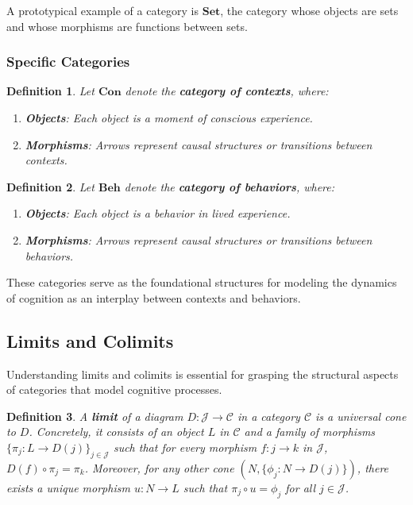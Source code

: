 \documentclass{article}
\newtheorem{definition}{Definition}[section]
\begin{document}
A prototypical example of a category is $\mathbf{Set}$, the category whose objects are sets and whose morphisms are functions between sets.

\subsubsection{Specific Categories}

\begin{definition}
Let $\mathbf{Con}$ denote the \textbf{category of contexts}, where:
\begin{enumerate}
    \item \textbf{Objects}: Each object is a moment of conscious experience.
    \item \textbf{Morphisms}: Arrows represent causal structures or transitions between contexts.
\end{enumerate}
\end{definition}

\begin{definition}
Let $\mathbf{Beh}$ denote the \textbf{category of behaviors}, where:
\begin{enumerate}
    \item \textbf{Objects}: Each object is a behavior in lived experience.
    \item \textbf{Morphisms}: Arrows represent causal structures or transitions between behaviors.
\end{enumerate}
\end{definition}

These categories serve as the foundational structures for modeling the dynamics of cognition as an interplay between contexts and behaviors.

\subsection{Limits and Colimits}

Understanding limits and colimits is essential for grasping the structural aspects of categories that model cognitive processes.

\begin{definition}
A \textbf{limit} of a diagram $D \colon \mathcal{J} \to \mathcal{C}$ in a category $\mathcal{C}$ is a universal cone to $D$. Concretely, it consists of an object $L$ in $\mathcal{C}$ and a family of morphisms $\{\pi_j \colon L \to D(j)\}_{j \in \mathcal{J}}$ such that for every morphism $f \colon j \to k$ in $\mathcal{J}$, $D(f) \circ \pi_j = \pi_k$. Moreover, for any other cone $(N, \{\phi_j \colon N \to D(j)\})$, there exists a unique morphism $u \colon N \to L$ such that $\pi_j \circ u = \phi_j$ for all $j \in \mathcal{J}$.
\end{definition}
\end{document}
